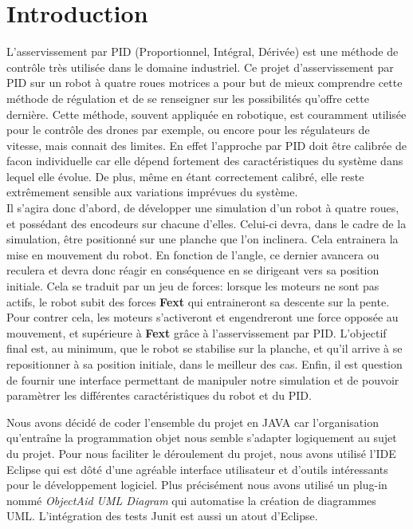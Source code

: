 \chapter{Introduction}

L'asservissement par PID (Proportionnel, Intégral, Dérivée) est une méthode de contrôle très utilisée dans le domaine industriel.
Ce projet d'asservissement par PID sur un robot à quatre roues motrices a pour but de mieux comprendre cette méthode de régulation
et de se renseigner sur les possibilités qu'offre cette dernière. %
Cette méthode, souvent appliquée en robotique, est couramment utilisée pour le contrôle des drones par exemple,
ou encore pour les régulateurs de vitesse, mais connait des limites. En effet l'approche par PID doit être calibrée de facon individuelle car elle dépend fortement des caractéristiques du système dans lequel elle évolue. De plus, même en étant correctement calibré, elle  reste extrêmement sensible aux variations imprévues du système. 
\\
Il s'agira donc d'abord, de développer une simulation d'un robot à quatre roues, et possédant des encodeurs sur chacune d'elles.
Celui-ci devra, dans le cadre de la simulation, être positionné sur une planche que l'on inclinera.
Cela entrainera la mise en mouvement du robot. En fonction de l'angle, ce dernier avancera ou reculera et devra donc réagir en conséquence en se dirigeant vers sa position initiale. Cela se traduit par un jeu de forces: lorsque les moteurs ne sont pas actifs, le robot subit des forces \textbf{Fext} qui entraineront sa descente sur la pente. Pour contrer cela, les moteurs s'activeront et engendreront une force opposée au mouvement, et supérieure à \textbf{Fext} grâce à l'asservissement par PID.
L'objectif final est, au minimum, que le robot se stabilise sur la planche, et qu'il arrive à se repositionner
à sa position initiale, dans le meilleur des cas. Enfin, il est question de fournir une interface permettant de manipuler notre
simulation et de pouvoir paramètrer les différentes caractéristiques du robot et du PID. 

Nous avons décidé de coder l'ensemble du projet en JAVA car l'organisation qu'entraîne la programmation objet nous semble s'adapter logiquement au sujet du projet. Pour nous faciliter le déroulement du projet, nous avons utilisé l'IDE Eclipse
qui est dôté d'une agréable interface utilisateur et d'outils intéressants pour le développement logiciel. Plus précisément nous avons utilisé un plug-in nommé \textit{ObjectAid UML Diagram}
qui automatise la création de diagrammes UML. L'intégration des tests Junit est aussi un atout d'Eclipse.
